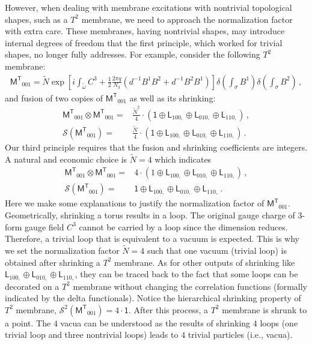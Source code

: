\documentclass[11pt,nofootinbib,preprint]{revtex4-1}
\begin{document}
However, when dealing with membrane excitations with nontrivial topological shapes, such as a $T^2$ membrane, we need to approach the normalization factor with extra care. These membranes, having nontrivial shapes, may introduce internal degrees of freedom that the first principle, which worked for trivial shapes, no longer fully addresses. For example, consider the following $T^2$ membrane:
 \begin{align}
	\mathsf{M^T}_{001}=\tilde{N}\exp \left[ i\int_{\tilde{\omega}}{C^3+\frac{1}{2}\frac{2\pi q}{N_3}\left( d^{-1}B^1B^2+d^{-1}B^2B^1 \right)} \right] \delta \left( \int_{\sigma}{B^1} \right) \delta \left( \int_{\sigma}{B^2} \right)\,,
\end{align}
and fusion of two copies of $\mathsf{M^T}_{001}$ as well as its shrinking:
\begin{align}
	{\mathsf{M}^{\mathsf{T}}}_{001}\otimes {\mathsf{M}^{\mathsf{T}}}_{001}= & \frac{\tilde{N}^2}{4}\cdot \left( \mathsf{1}\oplus \mathsf{L}_{100,}\oplus \mathsf{L}_{010,}\oplus \mathsf{L}_{110,} \right) \,,\label{eq_fusion_two_torus}\\
	\mathcal{S} \left( {\mathsf{M}^{\mathsf{T}}}_{001} \right) =&\frac{\tilde{N}}{4}\cdot \left( \mathsf{1}\oplus \mathsf{L}_{100,}\oplus \mathsf{L}_{010,}\oplus \mathsf{L}_{110,} \right) \label{eq_shrink_torus}\,.
\end{align}
Our third principle requires that the fusion and shrinking coefficients are integers. A natural and economic choice is $\tilde{N}=4$ which indicates 
\begin{align}
	{\mathsf{M}^{\mathsf{T}}}_{001}\otimes {\mathsf{M}^{\mathsf{T}}}_{001}=&4\cdot \left( 1\oplus \mathsf{L}_{100,}\oplus \mathsf{L}_{010,}\oplus \mathsf{L}_{110,} \right)   \,,\label{eq_fusion_two_torus_factor_set}\\
	\mathcal{S} \left( {\mathsf{M}^{\mathsf{T}}}_{001} \right) =&  \mathsf{1}\oplus \mathsf{L}_{100,}\oplus \mathsf{L}_{010,}\oplus \mathsf{L}_{110,}  \label{eq_shrink_torus_factor_set}\,.
\end{align}
Here we make some explanations to justify the normalization factor of ${\mathsf{M}^{\mathsf{T}}}_{001}$. Geometrically, shrinking a torus results in a loop. The original gauge charge of $3$-form gauge field $C^3$ cannot be carried by a loop since the dimension reduces. Therefore, a trivial loop that is equivalent to a vacuum is expected. This is why we set the normalization factor $\tilde{N}=4$ such that one vacuum (trivial loop) is obtained after shrinking a $T^2$ membrane. As for other outputs of shrinking like $\mathsf{L}_{100,}\oplus \mathsf{L}_{010,}\oplus \mathsf{L}_{110,}$, they can be traced back to the fact that some loops can be decorated on a $T^2$ membrane without changing the correlation functions (formally indicated by the delta functionals). Notice the hierarchical shrinking property of $T^2$ membrane, $\mathcal{S}^2 \left({\mathsf{M}^{\mathsf{T}}}_{001}\right)=4\cdot \mathsf{1}$. After this process, a $T^2$ membrane is shrunk to a point. The $4$ vacua can be understood as the results of shrinking $4$ loops (one trivial loop and three nontrivial loops) leads to $4$ trivial particles (i.e., vacua). 
\end{document}
